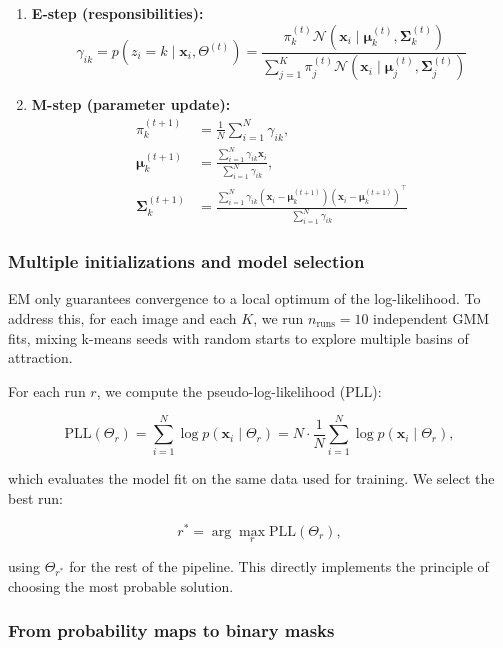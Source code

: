 \begin{enumerate}
  \item \textbf{E-step (responsibilities):}
    \[
      \gamma_{ik} = p(z_i = k \mid \mathbf{x}_i, \Theta^{(t)}) = \frac{\pi_k^{(t)} \mathcal{N}(\mathbf{x}_i \mid \boldsymbol{\mu}_k^{(t)}, \boldsymbol{\Sigma}_k^{(t)})}{\sum_{j=1}^K \pi_j^{(t)} \mathcal{N}(\mathbf{x}_i \mid \boldsymbol{\mu}_j^{(t)}, \boldsymbol{\Sigma}_j^{(t)})}
    \]
  \item \textbf{M-step (parameter update):}
    \begin{align}
      \pi_k^{(t+1)} &= \frac{1}{N}\sum_{i=1}^N \gamma_{ik}, \\
      \boldsymbol{\mu}_k^{(t+1)} &= \frac{\sum_{i=1}^N \gamma_{ik} \mathbf{x}_i}{\sum_{i=1}^N \gamma_{ik}}, \\
      \boldsymbol{\Sigma}_k^{(t+1)} &= \frac{\sum_{i=1}^N \gamma_{ik} (\mathbf{x}_i-\boldsymbol{\mu}_k^{(t+1)})(\mathbf{x}_i-\boldsymbol{\mu}_k^{(t+1)})^\top}{\sum_{i=1}^N \gamma_{ik}}
    \end{align}
\end{enumerate}

\subsubsection{Multiple initializations and model selection}

EM only guarantees convergence to a local optimum of the log-likelihood. To address this, for each image and each \(K\), we run \(n_{\text{runs}} = 10\) independent GMM fits, mixing k-means seeds with random starts to explore multiple basins of attraction.

For each run \(r\), we compute the pseudo-log-likelihood (PLL):

\[
  \text{PLL}(\Theta_r) = \sum_{i=1}^{N} \log p(\mathbf{x}_i \mid \Theta_r) = N \cdot \frac{1}{N} \sum_{i=1}^N \log p(\mathbf{x}_i \mid \Theta_r),
\]

which evaluates the model fit on the same data used for training. We select the best run:

\[
  r^* = \arg\max_r \text{PLL}(\Theta_r),
\]

using \(\Theta_{r^*}\) for the rest of the pipeline. This directly implements the principle of choosing the most probable solution.

\subsubsection{From probability maps to binary masks}

